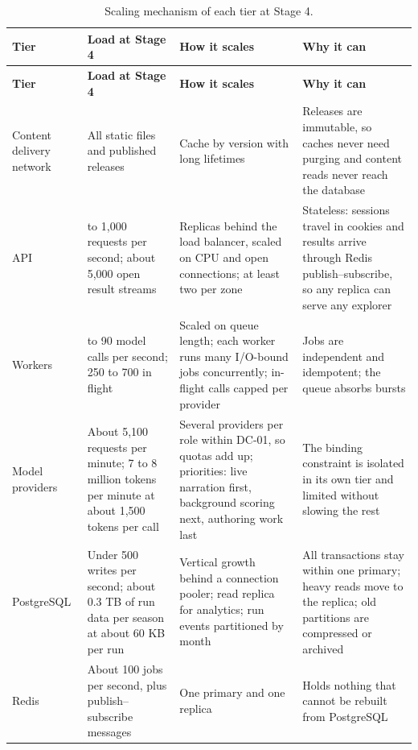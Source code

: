 {\small
\begin{longtable}{|>{\raggedright\arraybackslash}p{}|>{\raggedright\arraybackslash}p{}|>{\raggedright\arraybackslash}p{}|>{\raggedright\arraybackslash}p{}|}
\caption{Scaling mechanism of each tier at Stage 4.} \\
\hline
\textbf{Tier} & \textbf{Load at Stage 4} & \textbf{How it scales} & \textbf{Why it can} \\ \hline
\endfirsthead
\hline
\textbf{Tier} & \textbf{Load at Stage 4} & \textbf{How it scales} & \textbf{Why it can} \\ \hline
\endhead
Content delivery network & All static files and published releases & Cache by version with long lifetimes & Releases are immutable, so caches never need purging and content reads never reach the database \\ \hline
API & 500 to 1,000 requests per second; about 5,000 open result streams & Replicas behind the load balancer, scaled on CPU and open connections; at least two per zone & Stateless: sessions travel in cookies and results arrive through Redis publish--subscribe, so any replica can serve any explorer \\ \hline
Workers & 80 to 90 model calls per second; 250 to 700 in flight & Scaled on queue length; each worker runs many I/O-bound jobs concurrently; in-flight calls capped per provider & Jobs are independent and idempotent; the queue absorbs bursts\cite{r168} \\ \hline
Model providers & About 5,100 requests per minute; 7 to 8 million tokens per minute at about 1,500 tokens per call & Several providers per role within DC-01, so quotas add up; priorities: live narration first, background scoring next, authoring work last & The binding constraint is isolated in its own tier and limited without slowing the rest \\ \hline
PostgreSQL & Under 500 writes per second; about 0.3 TB of run data per season at about 60 KB per run & Vertical growth behind a connection pooler; read replica for analytics; run events partitioned by month & All transactions stay within one primary; heavy reads move to the replica; old partitions are compressed or archived \\ \hline
Redis & About 100 jobs per second, plus publish--subscribe messages & One primary and one replica & Holds nothing that cannot be rebuilt from PostgreSQL \\ \hline
\end{longtable}
}

